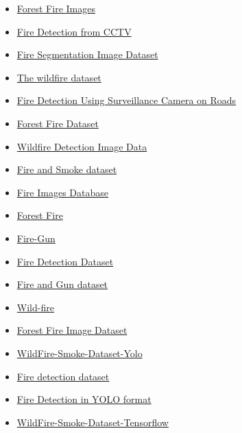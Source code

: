 \begin{itemize}
	\item \href{https://www.kaggle.com/datasets/mohnishsaiprasad/forest-fire-images}{Forest Fire Images}
	\item \href{https://www.kaggle.com/datasets/ritupande/fire-detection-from-cctv}{Fire Detection from CCTV}
	\item \href{https://www.kaggle.com/datasets/diversisai/fire-segmentation-image-dataset}{Fire Segmentation Image Dataset}
	\item \href{https://www.kaggle.com/datasets/elmadafri/the-wildfire-dataset}{The wildfire dataset}
	\item \href{https://www.kaggle.com/datasets/tharakan684/urecamain}{Fire Detection Using Surveillance Camera on Roads}
	\item \href{https://www.kaggle.com/datasets/alik05/forest-fire-dataset}{Forest Fire Dataset}
	\item \href{https://www.kaggle.com/datasets/brsdincer/wildfire-detection-image-data}{Wildfire Detection Image Data}
	\item \href{https://www.kaggle.com/datasets/ashutosh69/fire-and-smoke-dataset}{Fire and Smoke dataset}
	\item \href{https://www.kaggle.com/datasets/gondimjoaom/fire-images-database}{Fire Images Database}
	\item \href{https://www.kaggle.com/datasets/arbethi/forest-fire}{Forest Fire}
	\item \href{https://www.kaggle.com/datasets/parthmehta15/fire-gun}{Fire-Gun}
	\item \href{https://www.kaggle.com/datasets/christofel04/fire-detection-dataset}{Fire Detection Dataset}
	\item \href{https://www.kaggle.com/datasets/atulyakumar98/fire-and-gun-dataset}{Fire and Gun dataset}
	\item \href{https://www.kaggle.com/datasets/ashukr/wildfire}{Wild-fire}
	\item \href{https://www.kaggle.com/datasets/cristiancristancho/forest-fire-image-dataset}{Forest Fire Image Dataset}
	\item \href{https://www.kaggle.com/datasets/ahemateja19bec1025/wildfiresmokedatasetyolo}{WildFire-Smoke-Dataset-Yolo}
	\item \href{https://www.kaggle.com/datasets/kabilan03/fire-detection-dataset}{Fire detection dataset}
	\item \href{https://www.kaggle.com/datasets/ankan1998/fire-detection-in-yolo-format}{Fire Detection in YOLO format}
	\item \href{https://www.kaggle.com/datasets/ahemateja19bec1025/wildfiresmokedataset}{WildFire-Smoke-Dataset-Tensorflow}
\end{itemize}
